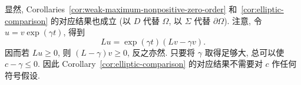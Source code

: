 显然, Corollaries~\ref{cor:weak-maximum-nonpositive-zero-order} 和~\ref{cor:elliptic-comparison} 的对应结果也成立 (以 $D$ 代替 $\Omega$, 以 $\Sigma$ 代替 $\partial\Omega$). 注意, 令 $u=v\exp(\gamma t)$, 得到
\begin{equation}\label{eq:parabolic-zero-order-exponential-shift}
Lu=\exp(\gamma t)(Lv-\gamma v).
\end{equation}
因而若 $Lu\geq0$, 则 $(L-\gamma)v\geq0$, 反之亦然. 只要将 $\gamma$ 取得足够大, 总可以使 $c-\gamma\leq0$. 因此 Corollary~\ref{cor:elliptic-comparison} 的对应结果不需要对 $c$ 作任何符号假设.
